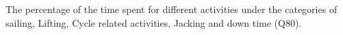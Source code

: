 The percentage of the time spent for different activities under the categories of sailing, Lifting, Cycle related activities, Jacking and down time (Q80).